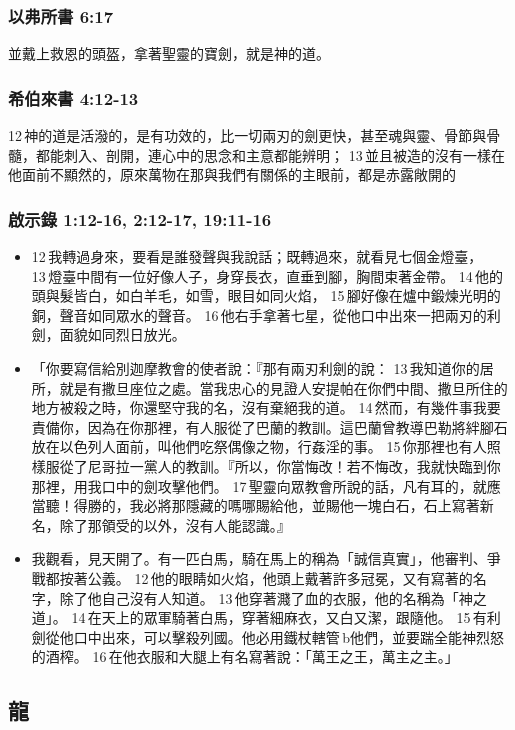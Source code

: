 \subsubsection{以弗所書 6:17}
並戴上救恩的頭盔，拿著聖靈的寶劍，就是神的道。

\subsubsection{希伯來書 4:12-13}
12 神的道是活潑的，是有功效的，比一切兩刃的劍更快，甚至魂與靈、骨節與骨髓，都能刺入、剖開，連心中的思念和主意都能辨明； 13 並且被造的沒有一樣在他面前不顯然的，原來萬物在那與我們有關係的主眼前，都是赤露敞開的

\subsubsection{啟示錄 1:12-16, 2:12-17, 19:11-16}
\begin{itemize} 
\itemsep-.25em
\item 12 我轉過身來，要看是誰發聲與我說話；既轉過來，就看見七個金燈臺， 13 燈臺中間有一位好像人子，身穿長衣，直垂到腳，胸間束著金帶。 14 他的頭與髮皆白，如白羊毛，如雪，眼目如同火焰， 15 腳好像在爐中鍛煉光明的銅，聲音如同眾水的聲音。 16 他右手拿著七星，從他口中出來一把兩刃的利劍，面貌如同烈日放光。
\item 「你要寫信給別迦摩教會的使者說：『那有兩刃利劍的說： 13 我知道你的居所，就是有撒旦座位之處。當我忠心的見證人安提帕在你們中間、撒旦所住的地方被殺之時，你還堅守我的名，沒有棄絕我的道。 14 然而，有幾件事我要責備你，因為在你那裡，有人服從了巴蘭的教訓。這巴蘭曾教導巴勒將絆腳石放在以色列人面前，叫他們吃祭偶像之物，行姦淫的事。 15 你那裡也有人照樣服從了尼哥拉一黨人的教訓。『所以，你當悔改！若不悔改，我就快臨到你那裡，用我口中的劍攻擊他們。 17 聖靈向眾教會所說的話，凡有耳的，就應當聽！得勝的，我必將那隱藏的嗎哪賜給他，並賜他一塊白石，石上寫著新名，除了那領受的以外，沒有人能認識。』
\item 我觀看，見天開了。有一匹白馬，騎在馬上的稱為「誠信真實」，他審判、爭戰都按著公義。 12 他的眼睛如火焰，他頭上戴著許多冠冕，又有寫著的名字，除了他自己沒有人知道。 13 他穿著濺了血的衣服，他的名稱為「神之道」。 14 在天上的眾軍騎著白馬，穿著細麻衣，又白又潔，跟隨他。 15 有利劍從他口中出來，可以擊殺列國。他必用鐵杖轄管 b他們，並要踹全能神烈怒的酒榨。 16 在他衣服和大腿上有名寫著說：「萬王之王，萬主之主。」
\end{itemize} 





\subsection{龍}
